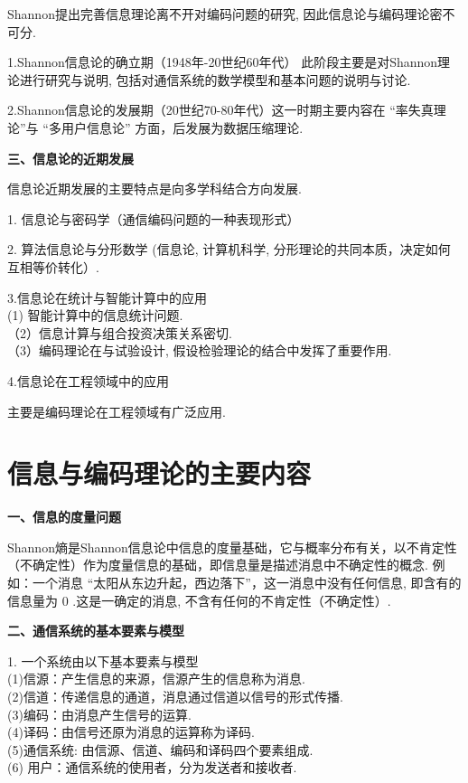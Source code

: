 Shannon提出完善信息理论离不开对编码问题的研究, 因此信息论与编码理论密不可分.

1.Shannon信息论的确立期（1948年-20世纪60年代）
此阶段主要是对Shannon理论进行研究与说明, 包括对通信系统的数学模型和基本问题的说明与讨论.

2.Shannon信息论的发展期（20世纪70-80年代）这一时期主要内容在 “率失真理论”与 “多用户信息论” 方面，后发展为数据压缩理论.

\textbf{三、信息论的近期发展}

信息论近期发展的主要特点是向多学科结合方向发展.

1. 信息论与密码学（通信编码问题的一种表现形式）

2. 算法信息论与分形数学 (信息论, 计算机科学, 分形理论的共同本质，决定如何互相等价转化）.

3.信息论在统计与智能计算中的应用\\
(1) 智能计算中的信息统计问题.\\
（2）信息计算与组合投资决策关系密切.\\
（3）编码理论在与试验设计, 假设检验理论的结合中发挥了重要作用.

4.信息论在工程领域中的应用

主要是编码理论在工程领域有广泛应用.


\section{信息与编码理论的主要内容}

\textbf{一、信息的度量问题}

Shannon熵是Shannon信息论中信息的度量基础，它与概率分布有关，以不肯定性（不确定性）作为度量信息的基础，即信息量是描述消息中不确定性的概念.
例如：一个消息 “太阳从东边升起，西边落下”，这一消息中没有任何信息, 即含有的信息量为 0 .这是一确定的消息, 不含有任何的不肯定性（不确定性）.


\textbf{二、通信系统的基本要素与模型}

1. 一个系统由以下基本要素与模型\\
(1)信源：产生信息的来源，信源产生的信息称为消息.\\
(2)信道：传递信息的通道，消息通过信道以信号的形式传播.\\
(3)编码：由消息产生信号的运算.\\
(4)译码：由信号还原为消息的运算称为译码.\\
(5)通信系统: 由信源、信道、编码和译码四个要素组成.\\
(6) 用户：通信系统的使用者，分为发送者和接收者.

